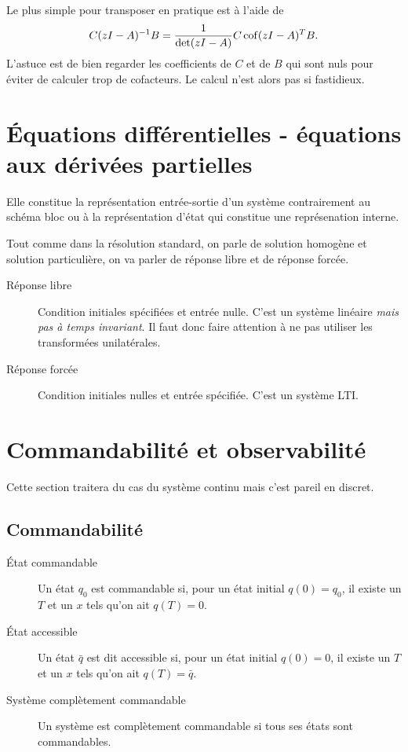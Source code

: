 Le plus simple pour transposer en pratique est à l'aide de
\[ C(zI-A)^{-1}B = \frac{1}{\det(zI-A)} C\operatorname{cof}(zI-A)^TB. \]
L'astuce est de bien regarder les coefficients de $C$ et de $B$
qui sont nuls pour éviter de calculer trop de cofacteurs.
Le calcul n'est alors pas si fastidieux.

\section{Équations différentielles - équations aux dérivées partielles}
Elle constitue la représentation entrée-sortie d'un système contrairement
au schéma bloc ou à la représentation d'état qui constitue une représenation
interne.

Tout comme dans la résolution standard,
on parle de solution homogène et solution particulière,
on va parler de réponse libre et de réponse forcée.
\begin{description}
  \item[Réponse libre]
    Condition initiales spécifiées et entrée nulle.
    C'est un système linéaire \emph{mais pas à temps invariant}.
    Il faut donc faire attention à ne pas utiliser les transformées
    unilatérales.
  \item[Réponse forcée]
    Condition initiales nulles et entrée spécifiée.
    C'est un système LTI.
\end{description}

\section{Commandabilité et observabilité}
Cette section traitera du cas du système continu mais c'est pareil en discret.
\subsection{Commandabilité}
\begin{description}
  \item[État commandable]
    Un état $q_0$ est commandable si,
    pour un état initial $q(0) = q_0$,
    il existe un $T$ et un $x$ tels qu'on ait $q(T) = 0$.
  \item[État accessible]
    Un état $\bar{q}$ est dit accessible si,
    pour un état initial $q(0) = 0$,
    il existe un $T$ et un $x$ tels qu'on ait $q(T) = \bar{q}$.
  \item[Système complètement commandable]
    Un système est complètement commandable si tous ses états sont
    commandables.
\end{description}

